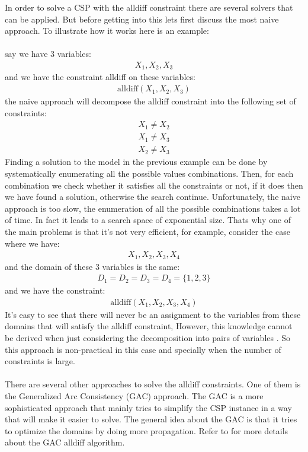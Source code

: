 In order to solve a CSP with the alldiff constraint there are several solvers that can be applied. But before getting into this lets first discuss the most naive approach. To illustrate how it works here is an example:
\\\\say we have 3 variables:
\begin{eqnarray*}
  X_{1}, X_{2}, X_{3}
\end{eqnarray*}
and we have the constraint alldiff on these variables:
\begin{eqnarray*}
  \textrm{alldiff}(X_{1}, X_{2}, X_{3})
\end{eqnarray*}
the naive approach will decompose the alldiff constraint into the following set of constraints:
\begin{eqnarray*}
  X_{1} \neq X_{2}\\
  X_{1} \neq X_{3}\\
  X_{2} \neq X_{3}
\end{eqnarray*}
Finding a solution to the model in the previous example can be done by systematically enumerating all the possible values combinations. Then, for each combination we check whether it satisfies all the constraints or not, if it does then we have found a solution, otherwise the search continue. Unfortunately, the naive approach is too slow, the enumeration of all the possible combinations takes a lot of time. In fact it leads to a search space of exponential size. Thats why one of the main problems is that it's not very efficient, for example, consider the case where we have:
\begin{eqnarray*}
  X_{1}, X_{2}, X_{3}, X_{4}
\end{eqnarray*}
and the domain of these 3 variables is the same:
\begin{eqnarray*}
  D_{1} = D_{2} = D_{3} = D_{4} = \{1, 2, 3\}
\end{eqnarray*}
and we have the constraint:
\begin{eqnarray*}
  \textrm{alldiff}(X_{1}, X_{2}, X_{3}, X_{4})
\end{eqnarray*}
It's easy to see that there will never be an assignment to the variables from these domains that will satisfy the alldiff constraint, However, this knowledge cannot be derived when just considering the decomposition into pairs of variables \cite{ml:csd}. So this approach is non-practical in this case and specially when the number of constraints is large.
\\\\
There are several other approaches to solve the alldiff constraints. One of them is the Generalized Arc Consistency (GAC) approach. The GAC is a more sophisticated approach that mainly tries to simplify the CSP instance in a way that will make it easier to solve. The general idea about the GAC is that it tries to optimize the domains by doing more propagation. Refer to \cite{gac:alldiff} for more details about the GAC alldiff algorithm.
